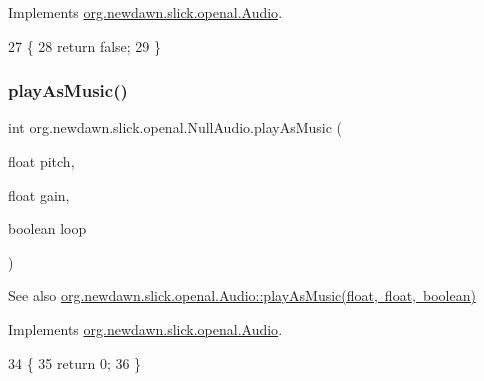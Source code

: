 Implements \mbox{\hyperlink{interfaceorg_1_1newdawn_1_1slick_1_1openal_1_1_audio_a842b49128a58be8c4473cbcc8ee4ad9e}{org.\+newdawn.\+slick.\+openal.\+Audio}}.


\begin{DoxyCode}
27                                \{
28         \textcolor{keywordflow}{return} \textcolor{keyword}{false};
29     \}
\end{DoxyCode}
\mbox{\label{classorg_1_1newdawn_1_1slick_1_1openal_1_1_null_audio_af43361f6993652cac2311408f18cf2d5}} 
\subsubsection{\texorpdfstring{play\+As\+Music()}{playAsMusic()}}
{\footnotesize\ttfamily int org.\+newdawn.\+slick.\+openal.\+Null\+Audio.\+play\+As\+Music (\begin{DoxyParamCaption}\item[{float}]{pitch,  }\item[{float}]{gain,  }\item[{boolean}]{loop }\end{DoxyParamCaption})\hspace{0.3cm}{\ttfamily [inline]}}

\begin{DoxySeeAlso}{See also}
\mbox{\hyperlink{interfaceorg_1_1newdawn_1_1slick_1_1openal_1_1_audio_a9a13784b5ec9ce06c8756f98b00e05ab}{org.\+newdawn.\+slick.\+openal.\+Audio\+::play\+As\+Music(float, float, boolean)}} 
\end{DoxySeeAlso}


Implements \mbox{\hyperlink{interfaceorg_1_1newdawn_1_1slick_1_1openal_1_1_audio_a9a13784b5ec9ce06c8756f98b00e05ab}{org.\+newdawn.\+slick.\+openal.\+Audio}}.


\begin{DoxyCode}
34                                                                   \{
35         \textcolor{keywordflow}{return} 0;
36     \}
\end{DoxyCode}
\mbox{\label{classorg_1_1newdawn_1_1slick_1_1openal_1_1_null_audio_a0c990dbf98b062eb385f582b4798ed6e}} 
